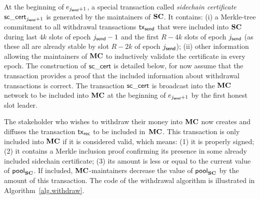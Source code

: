     At the beginning of $e_{j_{\mathsf{send}}+1}$, a special transaction called
    \emph{sidechain certificate
    $\mathsf{sc\_cert}_{j_{\mathsf{send}}+1}$} is generated by the maintainers of $\mathbf{SC}$.
    It contains:
        (i) a Merkle-tree commitment to all withdrawal transactions $\mathsf{tx}_{\mathsf{send}}$ that were
        included into $\mathbf{SC}$ during last
        $4k$ slots of epoch $j_{\mathsf{send}}-1$ and
        the first
        $R-4k$ slots of epoch $j_{\mathsf{send}}$ (as these all are already stable by slot
        $R-2k$ of epoch $j_{\mathsf{send}}$);
        (ii) other information allowing the maintainers of $\mathbf{MC}$ to
        inductively validate the certificate in every epoch.
    The construction of $\mathsf{sc\_cert}$ is detailed  below, for now  assume
    that the transaction provides a proof that the included information about
    withdrawal transactions is correct.
    The transaction $\mathsf{sc\_cert}$ is broadcast into the
    $\mathbf{MC}$ network to be
    included into $\mathbf{MC}$ at the beginning of $e_{j_{\mathsf{send}}+1}$ by the first honest
    slot leader.

    The stakeholder who wishes to withdraw their money into $\mathbf{MC}$ now creates
    and diffuses the transaction $\mathsf{tx}_{\mathsf{rec}}$ to be included in~$\mathbf{MC}$.
    This transaction is only included into $\mathbf{MC}$ if it is considered valid,
    which means:
    (1) it is properly signed;
    (2) it contains a Merkle inclusion proof confirming its presence in some
    already included sidechain certificate;
    (3) its amount is less or equal to the current value of $\mathsf{pool}_{\mathbf{SC}}$.
    If included, $\mathbf{MC}$-maintainers decrease the value of $\mathsf{pool}_{\mathbf{SC}}$ by the
    amount of this transaction.
The code of the withdrawal algorithm is illustrated in
Algorithm~\ref{alg.withdraw}.

